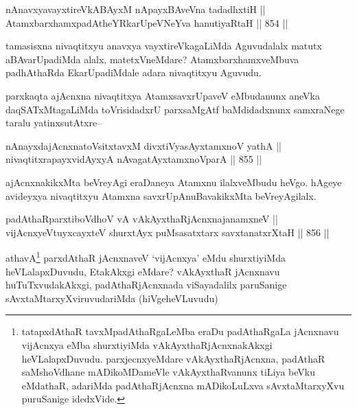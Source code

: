 
\begin{shl}
nAnavxyavayxtireVkABAyxM nApayxBAveVna tadadhxtiH || \\
AtamxbarxhamxpadAtheYRkarUpeVNeYva hanutiyaRtaH \hfill || 854 ||  
\end{shl}

\begin{artha}
tamasisxna nivaqtitxyu anavxya vayxtireVkagaLiMda Aguvudalalx matutx aBAvarUpadiMda alalx, matetxVneMdare? AtamxbarxhamxveMbuva padhAthaRda EkarUpadiMdale adara nivaqtitxyu Aguvudu.
\end{artha}

\begin{artha}
parxkaqta ajAcnxna nivaqtitxya AtamxsavxrUpaveV eMbudanunx aneVka daqSATxMtagaLiMda toVrisidadxrU parxsaMgAtf baMdidadxnunx samxraNege taralu yatinxsutAtxre--
\end{artha}

\begin{shl}
nAnayxdajAcnxnatoV\s sitxtavxM divxtiVyasAyx\s \s tamxnoV yathA || \\
nivaqtitxrapayxvidAyxyA nAvagatAyxtamxnoV\s parA \hfill || 855 ||  
\end{shl}

\begin{artha}
ajAcnxnakikxMta beVreyAgi eraDaneya Atamxnu ilalxveMbudu heVgo. hAgeye avideyxya nivaqtitxyu Atamxna savxrUpAnuBavakikxMta beVreyAgilalx.
\end{artha}


\begin{shl}
padAthaRparxtiboVdhoV vA vAkAyxthaRjAcnxnajanamxneV || \\
vijAcnxyeVtuyxcayxteV shurxtAyx puMsasatxtarx savxtanatxrXtaH \hfill || 856 ||  
\end{shl}

\begin{artha}
athavA\footnote{tatapxdAthaR tavxMpadAthaRgaLeMba eraDu padAthaRgaLa jAcnxnavu vijAcnxya eMba shurxtiyiMda vAkAyxthaRjAcnxnakAkxgi heVLalapxDuvudu. parxjecnxyeMdare vAkAyxthaRjAcnxna, padAthaR saMshoVdhane mADikoMDameVle vAkAyxthaRvanunx tiLiya beVku eMdathaR, adariMda padAthaRjAcnxna mADikoLuLxva sAvxtaMtarxyXvu puruSanige idedxVide.} parxdAthaR jAcnxnaveV `vijAcnxya' eMdu shurxtiyiMda heVLalapxDuvudu, EtakAkxgi eMdare? vAkAyxthaR jAcnxnavu huTuTxvudakAkxgi, padAthaRjAcnxnada viSayadalilx paruSanige sAvxtaMtarxyXviruvudariMda (hiVgeheVLuvudu)
\end{artha}

